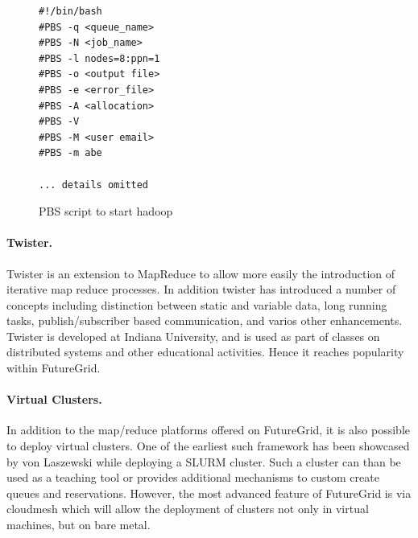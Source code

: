 \begin{figure}[htb]
\begin{center}
\begin{verbatim}
#!/bin/bash
#PBS -q <queue_name>
#PBS -N <job_name>
#PBS -l nodes=8:ppn=1
#PBS -o <output file>
#PBS -e <error_file>
#PBS -A <allocation>
#PBS -V
#PBS -M <user email>
#PBS -m abe

... details omitted
\end{verbatim}
\end{center}
\caption{PBS script to start hadoop}\label{F:myhadoop-script}
\end{figure}

\paragraph{Twister.}

Twister is an extension to MapReduce to allow more easily the
introduction of iterative map reduce processes. In addition twister
has introduced a number of concepts including distinction between
static and variable data, long running tasks, publish/subscriber based
communication, and varios other enhancements.  Twister is developed at
Indiana University, and is used as part of classes on distributed
systems and other educational activities. Hence it reaches popularity
within FutureGrid.

\paragraph{Virtual Clusters.} In addition to the map/reduce platforms
offered on FutureGrid, it is also possible to deploy virtual
clusters. One of the earliest such framework has been showcased by von
Laszewski while deploying a SLURM cluster. Such a cluster can than be
used as a teaching tool or provides additional mechanisms to custom
create queues and reservations. However, the most advanced feature of
FutureGrid is via cloudmesh which will allow the deployment of
clusters not only in virtual machines, but on bare metal.
